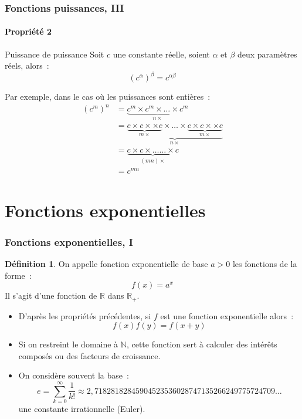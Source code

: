 \documentclass[10pt,notheorems]{beamer}
\theoremstyle{plain}
\theoremstyle{definition} %
\newtheorem{definition}{Définition}
\begin{document}
\begin{frame}
  \frametitle{Fonctions puissances, III}
  \framesubtitle{Propriété 2}
  \hypertarget{slide_fonctions_puissance_4}{}

  \bigskip

  \begin{block}{Puissance de puissance}
    Soit $c$ une constante réelle, soient $\alpha$ et $\beta$ deux paramètres réels, alors~:
    \[
      \left(c^{\alpha}\right)^{\beta} = c^{\alpha\beta}
    \]
  \end{block}

  \bigskip

  Par exemple, dans le cas où les puissances sont entières~:
  \[
    \begin{split}
      \left(c^m\right)^n &= \underbrace{c^m\times c^m \times \ldots \times c^m}_{n\times}\\
      &= \underbrace{\underbrace{c\times c \times \times c}_{m\times}\times \ldots \times \underbrace{c\times c \times \times c}_{m\times}}_{n\times}\\
      &=\underbrace{c\times c \times \ldots\ldots \times c}_{(mn)\times}\\
      &= c^{mn}
    \end{split}
  \]

\end{frame}


\section{Fonctions exponentielles}

\begin{frame}
  \frametitle{Fonctions exponentielles, I}
  \hypertarget{slide_fonctions_exponentielles_1}{}

  \bigskip

  \begin{definition}
    On appelle fonction exponentielle de base $a>0$ les fonctions de la forme~:
    \[
      f(x) = a^{x}
    \]
    Il s'agit d'une fonction de $\mathbb R$ dans $\mathbb R_+$.
  \end{definition}

  \bigskip

  \begin{itemize}

  \item D'après les propriétés précédentes, si $f$ est une fonction exponentielle alors~:
    \[
      f(x)f(y) = f(x+y)
    \]

  \item Si on restreint le domaine à $\mathbb N$, cette fonction sert à calculer des intérêts composés ou des facteurs de croissance.\newline

  \item On considère souvent la base~:
    \[
      e=\sum_{k=0}^{\infty}\frac{1}{k!} \approx 2,71828182845904523536028747135266249775724709\ldots
    \]
    une constante irrationnelle (Euler).
  \end{itemize}

\end{frame}
\end{document}
